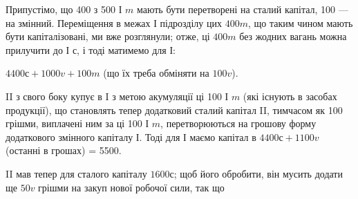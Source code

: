 Припустімо, що 400 з 500 І $m$ мають бути перетворені на сталий
капітал, 100 — на змінний. Переміщення в межах І підрозділу цих $400 m$,
що таким чином мають бути капіталізовані, ми вже розглянули; отже,
ці $400 m$ без жодних вагань можна прилучити до І $с$, і тоді матимемо
для І:

$4400 с + 1000 v + 100 m$ (що їх треба обміняти на $100 v$).

II з свого боку купує в I з метою акумуляції ці 100 І $m$ (які існують
в засобах продукції), що становлять тепер додатковий сталий капітал II,
тимчасом як 100 грішми, виплачені ним за ці 100 І $m$, перетворюються
на грошову форму додаткового змінного капіталу І. Тоді для І маємо
капітал в $4400 с + 1100 v$ (останні в грошах) = 5500.

II мав тепер для сталого капіталу $1600 с$; щоб його обробити, він
мусить додати ще $50 v$ грішми на закуп нової робочої сили, так що
\parbreak{}  %

